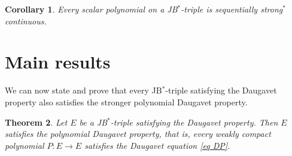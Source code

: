 \documentclass[10pt]{amsart}
\newtheorem{theorem}{Theorem}[section]
\newtheorem{corollary}[theorem]{Corollary}
\begin{document}
	\begin{corollary}\label{c scalar polynomials on JBstar triples as sequentilly strong* continuous} Every scalar polynomial on a JB$^*$-triple is sequentially strong$^*$ continuous.
	\end{corollary}
	
	\section{Main results}\label{section:proofs}
	
	We can now state and prove that every JB$^*$-triple satisfying the Daugavet property also satisfies the stronger polynomial Daugavet property.
	
	
	\begin{theorem}\label{t DPr for general wk polynomials} Let $E$ be a JB$^*$-triple satisfying the Daugavet property. Then $E$ satisfies the polynomial Daugavet property, that is, every weakly compact polynomial $P\colon E \longrightarrow E$ satisfies the Daugavet equation \eqref{eq DP}.
	\end{theorem}
	
\end{document}
